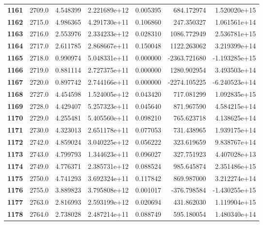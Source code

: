 \documentclass{report}[12pt]
\begin{document}
\begin{center}
\begin{tabular}{lrrrrrr}
\textbf{1161} &         2709.0 &   4.548399 &  2.221689e+12 &    0.005395 &   684.172974 &  1.520020e+15 \\
\textbf{1162} &         2715.0 &   4.986365 &  4.291730e+11 &    0.106860 &   247.350327 &  1.061561e+14 \\
\textbf{1163} &         2716.0 &   2.553976 &  2.334233e+12 &    0.028310 &  1086.772949 &  2.536781e+15 \\
\textbf{1164} &         2717.0 &   2.611785 &  2.868667e+11 &    0.150048 &  1122.263062 &  3.219399e+14 \\
\textbf{1165} &         2718.0 &   0.990974 &  5.048331e+11 &    0.000000 & -2363.721680 & -1.193285e+15 \\
\textbf{1166} &         2719.0 &   0.881114 &  2.727375e+11 &    0.000000 &  1280.902954 &  3.493503e+14 \\
\textbf{1167} &         2720.0 &   0.897742 &  2.744166e+11 &    0.000000 & -2274.105225 & -6.240523e+14 \\
\textbf{1168} &         2727.0 &   4.454598 &  1.524005e+12 &    0.043420 &   717.081299 &  1.092835e+15 \\
\textbf{1169} &         2728.0 &   4.429407 &  5.257323e+11 &    0.045640 &   871.967590 &  4.584215e+14 \\
\textbf{1170} &         2729.0 &   4.255481 &  5.405560e+11 &    0.098210 &   765.623718 &  4.138625e+14 \\
\textbf{1171} &         2730.0 &   4.323013 &  2.651178e+11 &    0.077053 &   731.438965 &  1.939175e+14 \\
\textbf{1172} &         2742.0 &   4.859024 &  3.040225e+12 &    0.056222 &   323.619659 &  9.838767e+14 \\
\textbf{1173} &         2743.0 &   4.799793 &  1.344623e+11 &    0.096027 &   327.751923 &  4.407028e+13 \\
\textbf{1174} &         2749.0 &   4.776371 &  2.385731e+12 &    0.088524 &   985.645874 &  2.351486e+15 \\
\textbf{1175} &         2750.0 &   4.741293 &  3.692324e+11 &    0.117842 &   869.987000 &  3.212274e+14 \\
\textbf{1176} &         2755.0 &   3.889823 &  3.795808e+12 &    0.001017 &  -376.798584 & -1.430255e+15 \\
\textbf{1177} &         2763.0 &   2.816993 &  2.593199e+12 &    0.020694 &   431.862030 &  1.119904e+15 \\
\textbf{1178} &         2764.0 &   2.738028 &  2.487214e+11 &    0.088749 &   595.180054 &  1.480340e+14 \\

\end{tabular}
\end{center}
\end{document}
